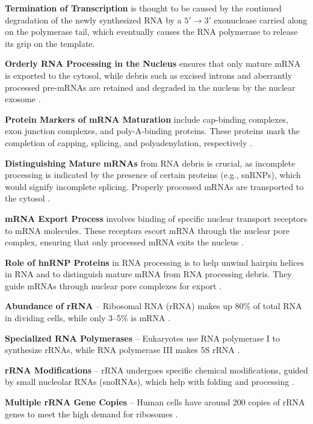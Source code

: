 \textbf{Termination of Transcription} is thought to be caused by the continued degradation of the newly synthesized RNA by a $5' \rightarrow 3'$ exonuclease carried along on the polymerase tail, which eventually causes the RNA polymerase to release its grip on the template\cite*{L1-Chapter6}.

\textbf{Orderly RNA Processing in the Nucleus} ensures that only mature mRNA is exported to the cytosol, while debris such as excised introns and aberrantly processed pre-mRNAs are retained and degraded in the nucleus by the nuclear exosome \cite*{L1-Chapter6}.

\textbf{Protein Markers of mRNA Maturation} include cap-binding complexes, exon junction complexes, and poly-A-binding proteins. These proteins mark the completion of capping, splicing, and polyadenylation, respectively \cite*{L1-Chapter6}.

\textbf{Distinguishing Mature mRNAs} from RNA debris is crucial, as incomplete processing is indicated by the presence of certain proteins (e.g., snRNPs), which would signify incomplete splicing. Properly processed mRNAs are transported to the cytosol \cite*{L1-Chapter6}.

\textbf{mRNA Export Process} involves binding of specific nuclear transport receptors to mRNA molecules. These receptors escort mRNA through the nuclear pore complex, ensuring that only processed mRNA exits the nucleus \cite*{L1-Chapter6}.

\textbf{Role of hnRNP Proteins} in RNA processing is to help unwind hairpin helices in RNA and to distinguish mature mRNA from RNA processing debris. They guide mRNAs through nuclear pore complexes for export \cite*{L1-Chapter6}.

\textbf{Abundance of rRNA} – Ribosomal RNA (rRNA) makes up 80\% of total RNA in dividing cells, while only 3–5\% is mRNA \cite*{L1-Chapter6}.

\textbf{Specialized RNA Polymerases} – Eukaryotes use RNA polymerase I to synthesize rRNAs, while RNA polymerase III makes 5S rRNA \cite*{L1-Chapter6}.

\textbf{rRNA Modifications} – rRNA undergoes specific chemical modifications, guided by small nucleolar RNAs (snoRNAs), which help with folding and processing \cite*{L1-Chapter6}.

\textbf{Multiple rRNA Gene Copies} – Human cells have around 200 copies of rRNA genes to meet the high demand for ribosomes \cite*{L1-Chapter6}.


